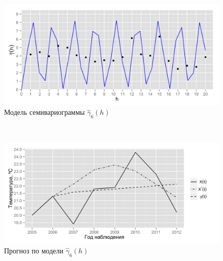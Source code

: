 \documentclass{beamer}
\begin{document}
\begin{frame}
\begin{multicols}{2}
    \columnbreak
    \begin{figure}[H]
      \begin{center}
        \begin{minipage}[H]{0.95\linewidth}
          \begin{center}
            \includegraphics[width=1\linewidth]{../../figures/variogram/per-fit-cv-modeled.png} \\ Модель семивариограммы $\widehat{\gamma}_6(h)$
          \end{center}
        \end{minipage}
        \\
        \begin{minipage}[H]{0.95\linewidth}
          \begin{center}
            \includegraphics[width=1\linewidth]{../../figures/variogram/per-fit-cv-cross-prediction.png} \\ Прогноз по модели $\widehat{\gamma}_6(h)$
          \end{center}
        \end{minipage}
      \end{center}
    \end{figure}
  \end{multicols}
\end{frame}
\end{document}
